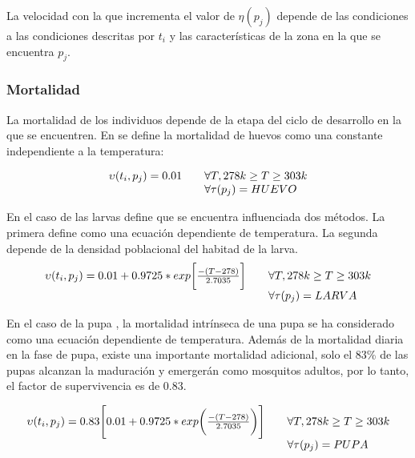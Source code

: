 La velocidad con la que incrementa el valor de $\eta(p_{j})$ depende de las condiciones a las condiciones
descritas  por $t_{i}$ y las características de la zona en la que se encuentra $p_{j}$.

\subsubsection{Mortalidad}
\label{subsec:mortalidad}
La mortalidad de los individuos depende de la etapa del ciclo de desarrollo en la que se encuentren. En 
\cite{otero2006stochastic} se define la mortalidad de huevos como una constante independiente a la temperatura:

\begin{equation}
 \begin{array}{l l}
    \upsilon(t_{i}, p_{j}) = 0.01 & \quad \forall T,  278 k \geq T \geq 303 k\\
              & \quad \forall \tau(p_{j}) = HUEVO 
\end{array}
\end{equation}

En el caso de las larvas \cite{otero2006stochastic} define que se encuentra influenciada dos métodos. La primera
define como una ecuación dependiente de temperatura. La segunda depende de la densidad poblacional del habitad de la
larva.
\begin{equation}
 \begin{array}{l l}
\upsilon(t_{i}, p_{j}) = 0.01 + 0.9725 * exp\bigg[ \frac{-(T - 278)}{2.7035}\bigg] &\quad  \forall T, 278 k \geq T \geq 303 k\\
              & \quad \forall \tau(p_{j}) = LARVA
 
\end{array}
\end{equation}

En el caso de la pupa \cite{otero2006stochastic}, la mortalidad intrínseca de una pupa se ha considerado como 
una ecuación dependiente de temperatura. Además de la mortalidad diaria en la fase de pupa, existe una importante 
mortalidad adicional, solo el 83\% \cite{otero2006stochastic} de las pupas alcanzan la maduración y emergerán como
mosquitos adultos, por lo tanto, el factor de supervivencia es de 0.83.

\begin{equation}
 \begin{array}{l l}

  \upsilon(t_{i}, p_{j}) = 0.83 \Bigg[ 0.01 + 0.9725 * exp\bigg( \frac{-(T - 278)}{2.7035}\bigg)\Bigg] &\quad  \forall T, 278 k \geq T \geq 303 k\\
              & \quad \forall \tau(p_{j}) = PUPA
\end{array}
\end{equation}


